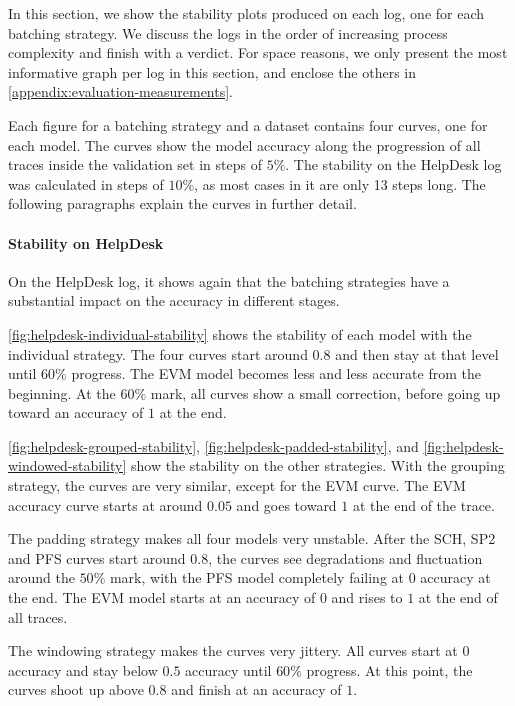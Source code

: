 In this section, we show the stability plots produced on each log, one for each batching strategy.
We discuss the logs in the order of increasing process complexity and finish with a verdict.
For space reasons, we only present the most informative graph per log in this section, and enclose the others in \autoref{appendix:evaluation-measurements}.

Each figure for a batching strategy and a dataset contains four curves, one for each model.
The curves show the model accuracy along the progression of all traces inside the validation set in steps of $5\%$.
The stability on the HelpDesk log was calculated in steps of $10\%$, as most cases in it are only 13 steps long.
The following paragraphs explain the curves in further detail.

\paragraph{Stability on HelpDesk}
On the HelpDesk log, it shows again that the batching strategies have a substantial impact on the accuracy in different stages.

\autoref{fig:helpdesk-individual-stability} shows the stability of each model with the individual strategy.
The four curves start around $0.8$ and then stay at that level until $60\%$ progress.
The EVM model becomes less and less accurate from the beginning.
At the $60\%$ mark, all curves show a small correction, before going up toward an accuracy of $1$ at the end.

\autoref{fig:helpdesk-grouped-stability}, \autoref{fig:helpdesk-padded-stability}, and \autoref{fig:helpdesk-windowed-stability} show the stability on the other strategies.
With the grouping strategy, the curves are very similar, except for the EVM curve.
The EVM accuracy curve starts at around $0.05$ and goes toward $1$ at the end of the trace.

The padding strategy makes all four models very unstable.
After the SCH, SP2 and PFS curves start around $0.8$, the curves see degradations and fluctuation around the $50\%$ mark, with the PFS model completely failing at $0$ accuracy at the end.
The EVM model starts at an accuracy of $0$ and rises to $1$ at the end of all traces.

The windowing strategy makes the curves very jittery.
All curves start at 0 accuracy and stay below $0.5$ accuracy until $60\%$ progress.
At this point, the curves shoot up above $0.8$ and finish at an accuracy of $1$.


